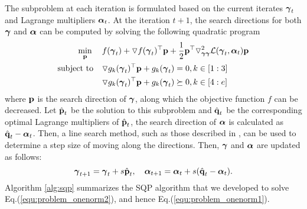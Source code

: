 \documentclass[10pt,letterpaper]{article}
\newcommand{\vect}[1]{\ensuremath\boldsymbol{\rm #1}}
\begin{document}
The subproblem at each iteration is formulated based on the current iterates $\vect \gamma_t$ and Lagrange multipliers $\vect \alpha_t$. At the iteration $t+1$, the search directions for both $\vect \gamma$ and $\vect \alpha$ can be computed by solving the following quadratic program 
\begin{equation}
\label{equ:problem_onenorm_subproblem}
\begin{split}
\min_{\vect p} \phantom{aa} & f(\vect \gamma_t) + \triangledown f(\vect \gamma_t)^\top \vect p + \frac{1}{2}\vect p^\top \triangledown^2_{\vect\gamma \vect\gamma}\mathcal{L}(\vect \gamma_t, \vect \alpha_t) \vect p \\
\mbox{subject to} \phantom{aa} & \triangledown g_k(\vect \gamma_t)^\top \vect p + g_k(\vect \gamma_t) = 0, k \in [1:3]  \\
                               & \triangledown g_k(\vect \gamma_t)^\top \vect p + g_k(\vect \gamma_t) \succeq 0, k \in [4:e]  
\end{split}
\end{equation}
where $\vect p$ is the search direction of $\vect \gamma$, along which the objective function $f$ can be decreased. Let $\hat{\vect p}_t$ be the solution to this subproblem and $\hat{\vect q}_t$ be the corresponding optimal Lagrange multipliers of $\hat{\vect p}_t$, the search direction of $\vect \alpha$ is calculated as $\hat{\vect q}_t - \vect \alpha_t$. Then, a line search method, such as those described in \cite{Nocedal:06}, can be used to determine a step size of moving along the directions. Then, $\vect \gamma$ and $\vect \alpha$ are updated as follows:
\begin{equation}
\label{equ:problem_onenorm_update}
\vect \gamma_{t+1} = \vect \gamma_t + s\hat{\vect p}_t, ~~~\vect \alpha_{t+1} = \vect \alpha_t + s(\hat{\vect q}_t - \vect \alpha_t).
\end{equation}
Algorithm \ref{alg:sqp} summarizes the SQP algorithm that we developed to solve Eq.(\ref{equ:problem_onenorm2}), and hence Eq.(\ref{equ:problem_onenorm1}). 
\end{document}
